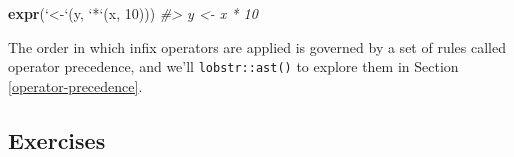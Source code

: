\documentclass[]{book}
\newenvironment{Shaded}{\begin{snugshade}}{\end{snugshade}}
\newcommand{\CommentTok}[1]{\textcolor[rgb]{0.37,0.37,0.37}{\textit{#1}}}
\newcommand{\DataTypeTok}[1]{\textcolor[rgb]{0.27,0.27,0.27}{#1}}
\newcommand{\DecValTok}[1]{\textcolor[rgb]{0.06,0.06,0.06}{#1}}
\newcommand{\KeywordTok}[1]{\textcolor[rgb]{0.27,0.27,0.27}{\textbf{#1}}}
\newcommand{\NormalTok}[1]{#1}
\newcommand{\StringTok}[1]{\textcolor[rgb]{0.5,0.5,0.5}{#1}}
\begin{document}
\begin{Shaded}
\begin{Highlighting}[]
\KeywordTok{expr}\NormalTok{(}\StringTok{`}\DataTypeTok{<-}\StringTok{`}\NormalTok{(y, }\StringTok{`}\DataTypeTok{*}\StringTok{`}\NormalTok{(x, }\DecValTok{10}\NormalTok{)))}
\CommentTok{#> y <- x * 10}
\end{Highlighting}
\end{Shaded}

The order in which infix operators are applied is governed by a set of rules called operator precedence, and we'll \texttt{lobstr::ast()} to explore them in Section \ref{operator-precedence}.

\hypertarget{exercises}{%
\subsection{Exercises}\label{exercises}}
\end{document}
